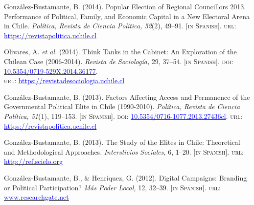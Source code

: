 \begin{publications}
\begin{benumerate}{10}
\item{\small Gonz\'alez-Bustamante, B. (2014). Popular Election of Regional Councillors 2013. Performance of Political, Family, and Economic Capital in a New Electoral Arena in Chile. {\itshape Pol\'itica, Revista de Ciencia Pol\'itica, 52}(2), 49--91. {\footnotesize \scshape [in Spanish]}. {\scshape url}: \href{https://revistapolitica.uchile.cl/index.php/RP/article/view/36137}{\textcolor{blue}{https://revistapolitica.uchile.cl}}} \vspace{1mm}

\item{\small Olivares, A. {\itshape et al.} (2014). Think Tanks in the Cabinet: An Exploration of the Chilean Case (2006-2014). {\itshape Revista de Sociolog\'ia,} 29, 37--54. {\footnotesize \scshape [in Spanish]}. {\scshape doi}: \href{https://doi.org/10.5354/0719-529X.2014.36177}{\textcolor{blue}{10.5354/0719-529X.2014.36177}}. \\ {\scshape url}: \href{https://revistadesociologia.uchile.cl/index.php/RDS/article/view/36177}{\textcolor{blue}{https://revistadesociologia.uchile.cl}}} \vspace{1mm}

\item{\small Gonz\'alez-Bustamante, B. (2013). Factors Affecting Access and Permanence of the Governmental Political Elite in Chile (1990-2010). {\itshape Pol\'itica, Revista de Ciencia Pol\'itica, 51}(1), 119--153. {\footnotesize \scshape [in Spanish]}. {\scshape doi}: \href{https://doi.org/10.5354/0716-1077.2013.27436}{\textcolor{blue}{10.5354/0716-1077.2013.27436cl}}. {\scshape url}: \href{https://revistapolitica.uchile.cl/index.php/RP/article/view/27436}{\textcolor{blue}{https://revistapolitica.uchile.cl}}} \vspace{1mm}

\item{\small Gonz\'alez-Bustamante, B. (2013). The Study of the Elites in Chile: Theoretical and Methodological Approaches. {\itshape Intersticios Sociales,} 6, 1--20. {\footnotesize \scshape [in Spanish]}. {\scshape url}: \href{http://ref.scielo.org/zrnp2k}{\textcolor{blue}{http://ref.scielo.org}}} \vspace{1mm}

\item{\small Gonz\'alez-Bustamante, B., \& Henr\'iquez, G. (2012). Digital Campaigns: Branding or Political Participation? {\itshape M\'as Poder Local,} 12, 32--39. {\footnotesize \scshape [in Spanish]}. {\scshape url}: \href{https://www.researchgate.net/publication/260517478_Campanas_digitales_Branding_o_participacion_politica_El_rol_de_las_redes_sociales_en_la_ultima_campana_presidencial_chilena}{\textcolor{blue}{www.researchgate.net}}} \vspace{1mm}

\end{benumerate}

\end{publications}
